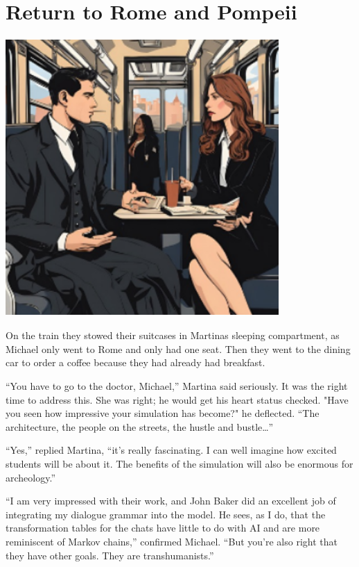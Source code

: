 \documentclass[
]{article}
\begin{document}
\section{Return to Rome and Pompeii}\label{return-to-rome-and-pompeii}

\includegraphics[width=4.10876in,height=4.16184in]{media/image3.png}

On the train they stowed their suitcases in Martina\textquotesingle s
sleeping compartment, as Michael only went to Rome and only had one
seat. Then they went to the dining car to order a coffee because they
had already had breakfast.

``You have to go to the doctor, Michael,'' Martina said seriously. It
was the right time to address this. She was right; he would get his
heart status checked. "Have you seen how impressive your simulation has
become?" he deflected. ``The architecture, the people on the streets,
the hustle and bustle\ldots''

``Yes,'' replied Martina, ``it's really fascinating. I can well imagine
how excited students will be about it. The benefits of the simulation
will also be enormous for archeology.''

``I am very impressed with their work, and John Baker did an excellent
job of integrating my dialogue grammar into the model. He sees, as I do,
that the transformation tables for the chats have little to do with AI
and are more reminiscent of Markov chains,'' confirmed Michael. ``But
you're also right that they have other goals. They are transhumanists.''
\end{document}
